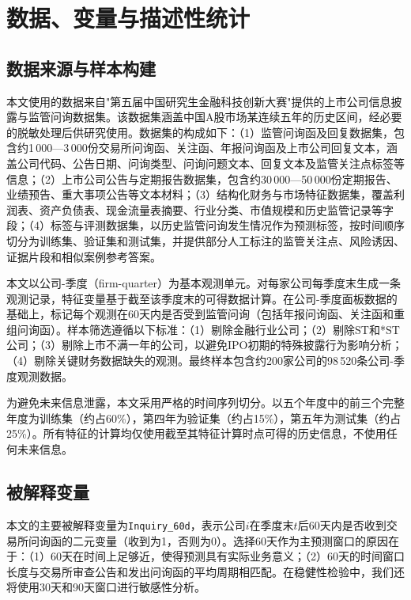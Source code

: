 
\section{数据、变量与描述性统计}
\label{sec:data}

\subsection{数据来源与样本构建}

本文使用的数据来自"第五届中国研究生金融科技创新大赛"提供的上市公司信息披露与监管问询数据集。该数据集涵盖中国A股市场某连续五年的历史区间，经必要的脱敏处理后供研究使用。数据集的构成如下：（1）监管问询函及回复数据集，包含约1\,000—3\,000份交易所问询函、关注函、年报问询函及上市公司回复文本，涵盖公司代码、公告日期、问询类型、问询问题文本、回复文本及监管关注点标签等信息；（2）上市公司公告与定期报告数据集，包含约30\,000—50\,000份定期报告、业绩预告、重大事项公告等文本材料；（3）结构化财务与市场特征数据集，覆盖利润表、资产负债表、现金流量表摘要、行业分类、市值规模和历史监管记录等字段；（4）标签与评测数据集，以历史监管问询发生情况作为预测标签，按时间顺序切分为训练集、验证集和测试集，并提供部分人工标注的监管关注点、风险诱因、证据片段和相似案例参考答案。

本文以公司-季度（firm-quarter）为基本观测单元。对每家公司每季度末生成一条观测记录，特征变量基于截至该季度末的可得数据计算。在公司-季度面板数据的基础上，标记每个观测在60天内是否受到监管问询（包括年报问询函、关注函和重组问询函）。样本筛选遵循以下标准：（1）剔除金融行业公司；（2）剔除ST和*ST公司；（3）剔除上市不满一年的公司，以避免IPO初期的特殊披露行为影响分析；（4）剔除关键财务数据缺失的观测。最终样本包含约200家公司的98\,520条公司-季度观测数据。

为避免未来信息泄露，本文采用严格的时间序列切分。以五个年度中的前三个完整年度为训练集（约占60\%），第四年为验证集（约占15\%），第五年为测试集（约占25\%）。所有特征的计算均仅使用截至其特征计算时点可得的历史信息，不使用任何未来信息。

\subsection{被解释变量}

本文的主要被解释变量为\texttt{Inquiry\_60d}，表示公司$i$在季度末$t$后60天内是否收到交易所问询函的二元变量（收到为1，否则为0）。选择60天作为主预测窗口的原因在于：（1）60天在时间上足够近，使得预测具有实际业务意义；（2）60天的时间窗口长度与交易所审查公告和发出问询函的平均周期相匹配。在稳健性检验中，我们还将使用30天和90天窗口进行敏感性分析。

